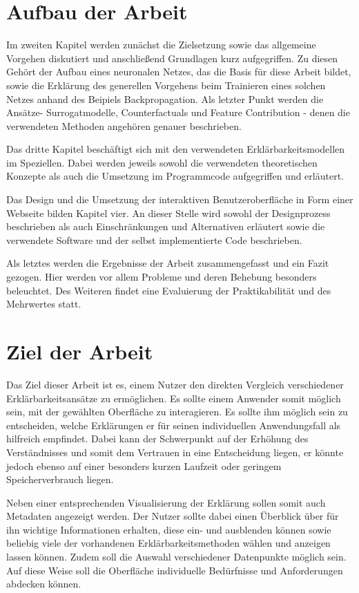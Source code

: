 \section{Aufbau der Arbeit}
\label{section: Aufbau}

Im zweiten Kapitel werden zunächst die Zielsetzung sowie das allgemeine Vorgehen diskutiert und anschließend Grundlagen kurz aufgegriffen. Zu diesen Gehört der Aufbau eines neuronalen Netzes, das die Basis für diese Arbeit bildet, sowie die Erklärung des generellen Vorgehens beim Trainieren eines solchen Netzes anhand des Beipiels Backpropagation. Als letzter Punkt werden die Ansätze- Surrogatmodelle, Counterfactuals und Feature Contribution - denen die verwendeten Methoden angehören genauer beschrieben.

Das dritte Kapitel beschäftigt sich mit den verwendeten Erklärbarkeitsmodellen im Speziellen. Dabei werden jeweils sowohl die verwendeten theoretischen Konzepte als auch die Umsetzung im Programmcode aufgegriffen und erläutert. 

Das Design und die Umsetzung der interaktiven Benutzeroberfläche in Form einer Webseite bilden Kapitel vier. An dieser Stelle wird sowohl der Designprozess beschrieben als auch Einschränkungen und Alternativen erläutert sowie die verwendete Software und der selbst implementierte Code beschrieben.

Als letztes werden die Ergebnisse der Arbeit zusammengefasst und ein Fazit gezogen. Hier werden vor allem Probleme und deren Behebung besonders beleuchtet. Des Weiteren findet eine Evaluierung der Praktikabilität und des Mehrwertes statt.

\section{Ziel der Arbeit}
\label{section: Ziel}
Das Ziel dieser Arbeit ist es, einem Nutzer den direkten Vergleich verschiedener Erklärbarkeitsansätze zu ermöglichen. Es sollte einem Anwender somit möglich sein, mit der gewählten Oberfläche zu interagieren. Es sollte ihm möglich sein zu entscheiden, welche Erklärungen er für seinen individuellen Anwendungsfall als hilfreich empfindet. Dabei kann der Schwerpunkt auf der Erhöhung des Verständnisses und somit dem Vertrauen in eine Entscheidung liegen, er könnte jedoch ebenso auf einer besonders kurzen Laufzeit oder geringem Speicherverbrauch liegen. 

Neben einer entsprechenden Visualisierung der Erklärung sollen somit auch Metadaten angezeigt werden. Der Nutzer sollte dabei einen Überblick über für ihn wichtige Informationen erhalten, diese ein- und ausblenden können sowie beliebig viele der vorhandenen Erklärbarkeitsmethoden wählen und anzeigen lassen können.
Zudem soll die Auswahl verschiedener Datenpunkte möglich sein. Auf diese Weise soll die Oberfläche individuelle Bedürfnisse und Anforderungen abdecken können.


